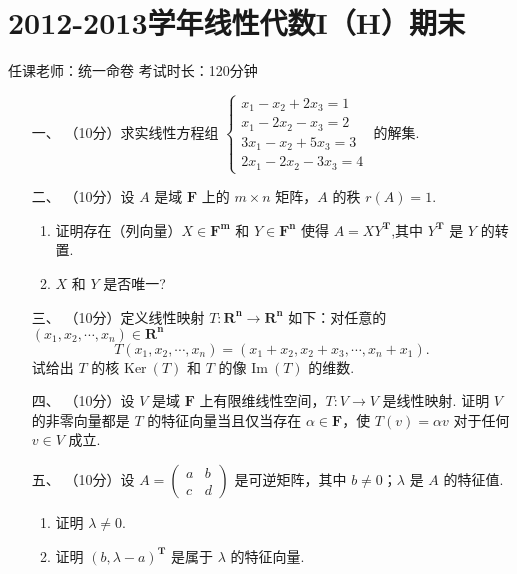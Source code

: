 \section*{2012-2013学年线性代数I（H）期末}

\begin{center}
    任课老师：统一命卷\hspace{4em} 考试时长：120分钟
\end{center}

\begin{enumerate}
    \item [一、]（10分）求实线性方程组 $\begin{cases}x_1-x_2+2x_3 = 1 \\ x_1-2x_2-x_3=2 \\ 3x_1-x_2+5x_3=3 \\ 2x_1-2x_2-3x_3 = 4\end{cases}$ 的解集.
    \item [二、]（10分）设 $A$ 是域 $\mathbf{F}$ 上的 $m\times n$ 矩阵，$A$ 的秩 $r(A)=1.$
    \begin{enumerate}[label=(\arabic*)]
        \item 证明存在（列向量）$X\in \mathbf{F^m}$ 和 $Y\in \mathbf{F^n}$ 使得 $A=XY^\mathbf{T}$,其中 $Y^\mathbf{T}$ 是 $Y$ 的转置.
        \item $X$ 和 $Y$ 是否唯一?
    \end{enumerate}
    \item [三、]（10分）定义线性映射 $T:\mathbf{R^n} \to \mathbf{R^n}$ 如下：对任意的 $(x_1,x_2,\cdots,x_n) \in \mathbf{R^n}$
    \[T(x_1,x_2,\cdots,x_n)=(x_1+x_2,x_2+x_3,\cdots,x_n+x_1).\]
    试给出 $T$ 的核 $\mathrm{Ker} \ (T)$ 和 $T$ 的像 $\mathrm{Im} \ (T)$ 的维数.
    \item [四、]（10分）设 $V$ 是域 $\mathbf{F}$ 上有限维线性空间，$T:V\to V$ 是线性映射. 证明 $V$ 的非零向量都是 $T$ 的特征向量当且仅当存在 $\alpha \in \mathbf{F}$，使 $T(v)=\alpha v$ 对于任何 $v \in V$ 成立. 
    \item [五、]（10分）设 $A=\begin{pmatrix}a & b \\ c & d\end{pmatrix}$ 是可逆矩阵，其中 $b\neq 0$；$\lambda$ 是 $A$ 的特征值.
    \begin{enumerate}[label=(\arabic*)]
        \item 证明 $\lambda \neq 0.$
        \item 证明 $(b,\lambda-a)^\mathbf{T}$ 是属于 $\lambda$ 的特征向量.

\end{enumerate}
\end{enumerate}
